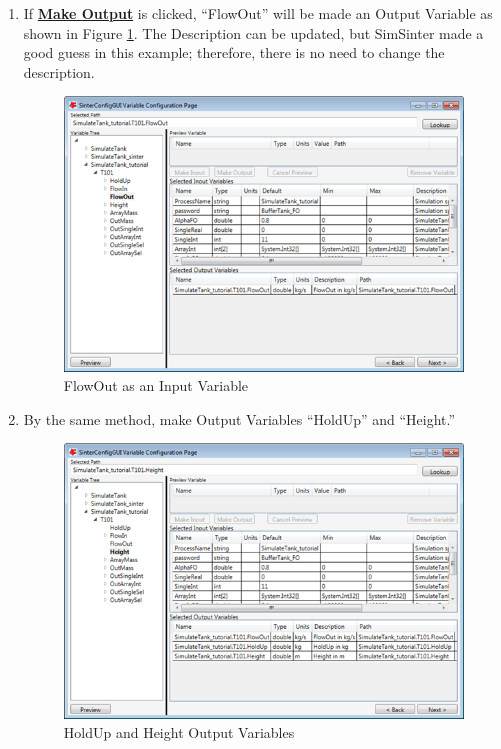 \begin{enumerate}
\item If \textbf{\underline{Make Output}} is clicked, ``FlowOut'' will be made an Output Variable as shown in Figure \ref{fig.sinter.gproms.outputs2}.
The Description can be updated, but SimSinter made a good guess in this example; therefore, there is no need to change the description.


\begin{figure}[H]
	\begin{center}
		\includegraphics[scale=0.55]{Chapt_sinter/figs/gPROMS/21_OutputVariables}
		\caption{FlowOut as an Input Variable}
		\label{fig.sinter.gproms.outputs2}
	\end{center}
\end{figure}

\item By the same method, make Output Variables ``HoldUp'' and ``Height.''

\begin{figure}[H]
	\begin{center}
		\includegraphics[scale=0.55]{Chapt_sinter/figs/gPROMS/22_OutputVariables}
		\caption{HoldUp and Height Output Variables}
		\label{fig.sinter.gproms.outputs3}
	\end{center}
\end{figure}


\end{enumerate}
